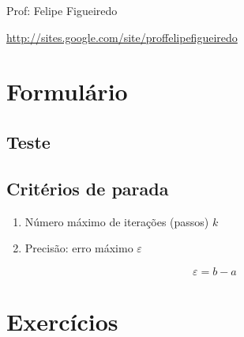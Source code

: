\documentclass[a4paper]{article}
\begin{document}
\parbox[c]{.825\textwidth}{\raggedright%
{Prof: Felipe Figueiredo\par}
{\url{http://sites.google.com/site/proffelipefigueiredo}}

\vspace{1cm}
}


\section{Formulário}

\subsection*{Teste}

\begin{center}
\end{center}

\subsection*{Critérios de parada}

\begin{enumerate}
\item Número máximo de iterações (passos) $k$

\item Precisão: erro máximo $\varepsilon$

\begin{displaymath}
  \varepsilon = b - a
\end{displaymath}

\end{enumerate}

\section{Exercícios}
\end{document}
